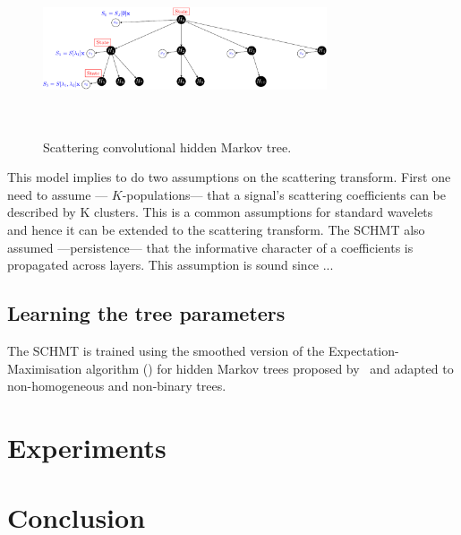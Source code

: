 \documentclass{article}
\begin{document}
    \begin{figure}[h]
      \begin{center}
				\includegraphics[width=3.3in, height=2in, keepaspectratio]{scat_HMT_crop.pdf}
				\caption{Scattering convolutional hidden Markov tree.}
				\label{fig:SCHMT 1}
      \end{center}
    \end{figure}
    
    This model implies to do two assumptions on the scattering transform. First one need to assume --- $K$-populations--- that a signal’s scattering coefficients can be described by K clusters. This is a common assumptions for standard wavelets~\citep{kingsbury2001complex} and hence it can be extended to the scattering transform. The SCHMT also assumed ---persistence--- that the informative character of a coefficients is propagated across layers. This assumption is sound since ...

  \subsection{Learning the tree parameters}
    \label{subsec:SCHMT/Learning}    

    The SCHMT is trained using the smoothed version of the Expectation-Maximisation algorithm (\cite{someone}) for hidden Markov trees proposed by~\citep{Durand} and adapted to non-homogeneous and non-binary trees.\\
    
    
    
\section{Experiments}
\label{sec:Exp}


\section{Conclusion}
\label{sec:print}
\end{document}
